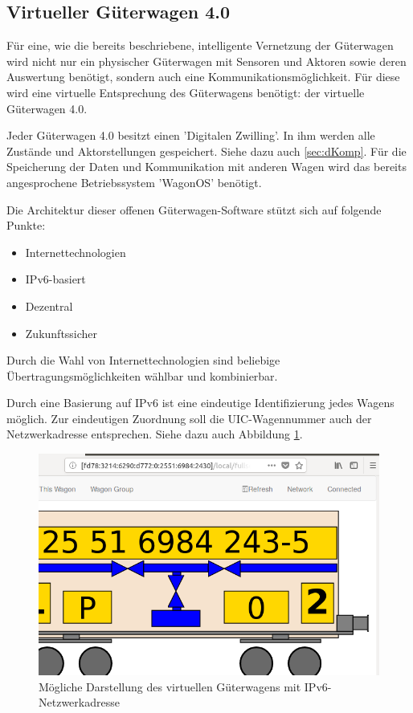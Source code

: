 \subsection{Virtueller Güterwagen 4.0}
Für eine, wie die bereits beschriebene, intelligente Vernetzung der Güterwagen wird nicht nur ein physischer Güterwagen mit Sensoren und Aktoren sowie deren Auswertung benötigt, sondern auch eine Kommunikationsmöglichkeit. Für diese wird eine virtuelle Entsprechung des Güterwagens benötigt: der virtuelle Güterwagen 4.0.\par
Jeder Güterwagen 4.0 besitzt einen 'Digitalen Zwilling'. In ihm werden alle Zustände und Aktorstellungen gespeichert. Siehe dazu auch \ref{sec:dKomp}. Für die Speicherung der Daten und Kommunikation mit anderen Wagen wird das bereits angesprochene Betriebssystem '\gls{WagonOS}' benötigt.\par
Die Architektur dieser offenen Güterwagen-Software stützt sich auf folgende Punkte:
\begin{itemize}
    \item Internettechnologien
    \item IPv6-basiert
    \item Dezentral
    \item Zukunftssicher
\end{itemize}
Durch die Wahl von Internettechnologien sind beliebige Übertragungsmöglichkeiten wählbar und kombinierbar.\par
Durch eine Basierung auf IPv6 ist eine eindeutige Identifizierung jedes Wagens möglich. Zur eindeutigen Zuordnung soll die UIC-Wagennummer auch der Netzwerkadresse entsprechen. Siehe dazu auch Abbildung \ref{fig:IPv6}.\par
\begin{figure}
    \centering
    \includegraphics[width=\textwidth]{Bilder/ipv6_concept.png}
    \caption{Mögliche Darstellung des virtuellen Güterwagens mit IPv6-Netzwerkadresse\cite{GAK}}
    \label{fig:IPv6}
\end{figure}
